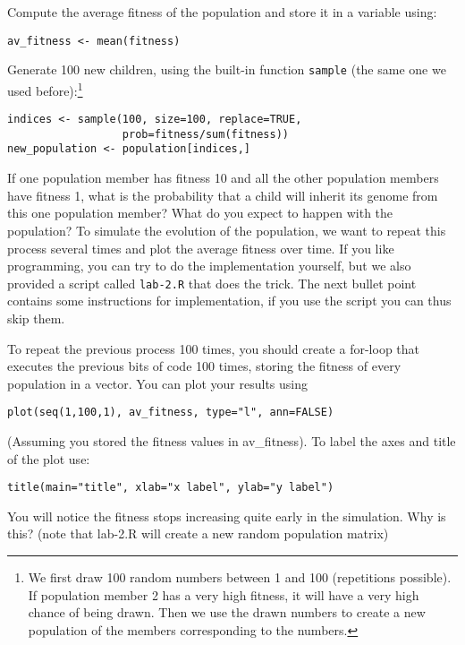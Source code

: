 \documentclass[a4paper, 9pt]{article}
\begin{document}
\begin{exercise}
    \action Compute the average fitness of the population and store it in a variable using:
\begin{lstlisting}
av_fitness <- mean(fitness)
\end{lstlisting}
    \action Generate 100 new children, using the built-in function \texttt{sample} (the same one we used before):\footnote{We first draw 100 random numbers between 1 and 100 (repetitions possible). If population member 2 has a very high fitness, it will have a very high chance of being drawn. Then we use the drawn numbers to create a new population of the members corresponding to the numbers.}
\begin{lstlisting}
indices <- sample(100, size=100, replace=TRUE, 
                  prob=fitness/sum(fitness))
new_population <- population[indices,]
\end{lstlisting}
    \askstar If one population member has fitness 10 and all the other population members have fitness 1, what is the probability that a child will inherit its genome from this one population member? What do you expect to happen with the population?
    \action To simulate the evolution of the population, we want to repeat this process several times and plot the average fitness over time. If you like programming, you can try to do the implementation yourself, but we also provided a script called \texttt{lab-2.R} that does the trick. The next bullet point contains some instructions for implementation, if you use the script you can thus skip them.

    \action To repeat the previous process 100 times, you should create a for-loop that executes the previous bits of code 100 times, storing the fitness of every population in a vector. You can plot your results using
\begin{lstlisting}
plot(seq(1,100,1), av_fitness, type="l", ann=FALSE)
\end{lstlisting}
    (Assuming you stored the fitness values in av\_fitness).
    To label the axes and title of the plot use:
\begin{lstlisting}
title(main="title", xlab="x label", ylab="y label")
\end{lstlisting}
    \askstar You will notice the fitness stops increasing quite early in the simulation. Why is this? (note that lab-2.R will create a new random population matrix)
\end{exercise}
\end{document}

